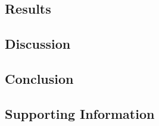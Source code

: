 \subsection*{Results}

\subsection*{Discussion}

\subsection*{Conclusion}

\subsection*{Supporting Information}



